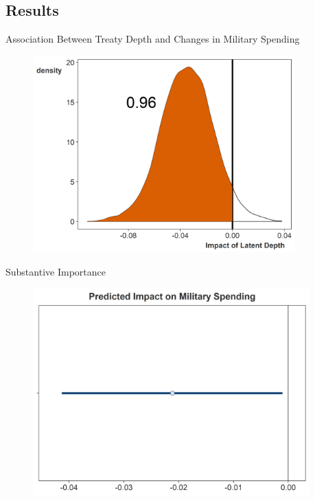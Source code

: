 \documentclass[12pt]{beamer}
\begin{document}

\subsection{Results}


\begin{frame}{Association Between Treaty Depth and Changes in Military Spending} 

\begin{figure}
	\centering
		\includegraphics[width=0.90\textwidth]{depth-post.png}
	\label{fig:depth-post}
\end{figure}


\end{frame}



\begin{frame}{Substantive Importance} 

\pause 

\begin{figure}
	\centering
		\includegraphics[width=0.95\textwidth]{pred-impact-depth.png}
\end{figure}

\end{frame}
\end{document}
